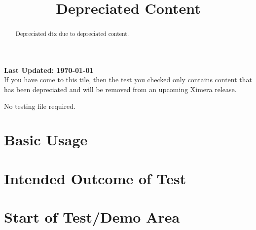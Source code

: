 \documentclass{ximera}
\title{Depreciated Content}
\begin{document}
\begin{abstract}
    Depreciated dtx due to depreciated content.
\end{abstract}
\maketitle

{{\Huge \bfseries Last Updated: \today}} \\

If you have come to this tile, then the test you checked only contains content that has been depreciated and
will be removed from an upcoming Ximera release.

No testing file required.


\section{Basic Usage}


\section{Intended Outcome of Test}


\section{Start of Test/Demo Area}



\hrulefill
\end{document}
